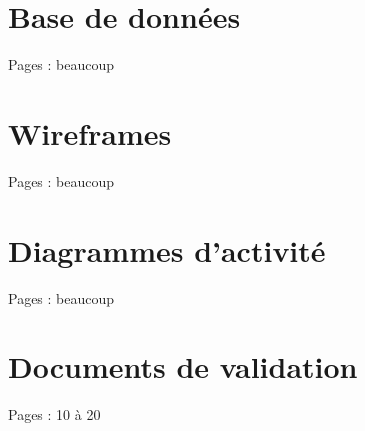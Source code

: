 \documentclass{eplmastersthesis_FR}
\begin{document}
	\chapter{Base de données}

		Pages : beaucoup

	\chapter{Wireframes}

		Pages : beaucoup

	\chapter{Diagrammes d'activité}

		Pages : beaucoup

	\chapter{Documents de validation}
		Pages : 10 à 20
	\setlength{\parskip}{0em}
	\backcoverpage
\end{document}
